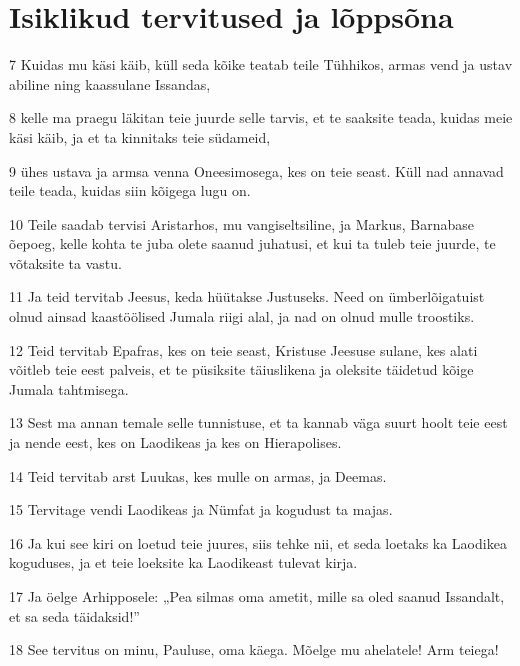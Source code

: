 \section*{Isiklikud tervitused ja lõppsõna}

\par 7 Kuidas mu käsi käib, küll seda kõike teatab teile Tühhikos, armas vend ja ustav abiline ning kaassulane Issandas,
\par 8 kelle ma praegu läkitan teie juurde selle tarvis, et te saaksite teada, kuidas meie käsi käib, ja et ta kinnitaks teie südameid,
\par 9 ühes ustava ja armsa venna Oneesimosega, kes on teie seast. Küll nad annavad teile teada, kuidas siin kõigega lugu on.
\par 10 Teile saadab tervisi Aristarhos, mu vangiseltsiline, ja Markus, Barnabase õepoeg, kelle kohta te juba olete saanud juhatusi, et kui ta tuleb teie juurde, te võtaksite ta vastu.
\par 11 Ja teid tervitab Jeesus, keda hüütakse Justuseks. Need on ümberlõigatuist olnud ainsad kaastöölised Jumala riigi alal, ja nad on olnud mulle troostiks.
\par 12 Teid tervitab Epafras, kes on teie seast, Kristuse Jeesuse sulane, kes alati võitleb teie eest palveis, et te püsiksite täiuslikena ja oleksite täidetud kõige Jumala tahtmisega.
\par 13 Sest ma annan temale selle tunnistuse, et ta kannab väga suurt hoolt teie eest ja nende eest, kes on Laodikeas ja kes on Hierapolises.
\par 14 Teid tervitab arst Luukas, kes mulle on armas, ja Deemas.
\par 15 Tervitage vendi Laodikeas ja Nümfat ja kogudust ta majas.
\par 16 Ja kui see kiri on loetud teie juures, siis tehke nii, et seda loetaks ka Laodikea koguduses, ja et teie loeksite ka Laodikeast tulevat kirja.
\par 17 Ja öelge Arhipposele: „Pea silmas oma ametit, mille sa oled saanud Issandalt, et sa seda täidaksid!”
\par 18 See tervitus on minu, Pauluse, oma käega. Mõelge mu ahelatele! Arm teiega!





